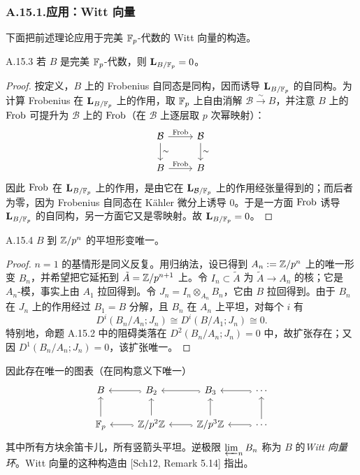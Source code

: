 \subsubsection*{A.15.1.\quad 应用：Witt 向量}

下面把前述理论应用于完美 $\mathbb{F}_p$-代数的 Witt 向量的构造。

\begin{lem}{A.15.3}\label{thm:a6-08-7}
若 $B$ 是完美 $\mathbb{F}_p$-代数，则 $\mathbf L_{B/\mathbb{F}_p}=0$。
\end{lem}

\begin{proof}
按定义，$B$ 上的 Frobenius 自同态是同构，因而诱导 $\mathbf L_{B/\mathbb{F}_p}$ 的自同构。为计算 Frobenius 在 $\mathbf L_{B/\mathbb{F}_p}$ 上的作用，取 $\mathbb{F}_p$ 上自由消解 $\mathcal B\xrightarrow{\sim}B$，并注意 $B$ 上的 $\operatorname{Frob}$ 可提升为 $\mathcal B$ 上的 $\operatorname{Frob}$（在 $\mathcal B$ 上逐层取 $p$ 次幂映射）：
\[
\begin{tikzcd}
\mathcal B \arrow[r, "\Frob"] \arrow[d, "\sim"] & \mathcal B \arrow[d, "\sim"] \\
B \arrow[r, "\Frob"] & B
\end{tikzcd}
\]
因此 $\operatorname{Frob}$ 在 $\mathbf L_{B/\mathbb{F}_p}$ 上的作用，是由它在 $\mathbf L_{\mathcal B/\mathbb{F}_p}$ 上的作用经张量得到的；而后者为零，因为 Frobenius 自同态在 Kähler 微分上诱导 0。于是一方面 $\operatorname{Frob}$ 诱导 $\mathbf L_{B/\mathbb{F}_p}$ 的自同构，另一方面它又是零映射。故 $\mathbf L_{B/\mathbb{F}_p}=0$。
\end{proof}

\begin{lem}{A.15.4}\label{thm:a6-08-8}
$B$ 到 $\mathbb{Z}/p^n$ 的平坦形变唯一。
\end{lem}

\begin{proof}
$n=1$ 的基情形是同义反复。用归纳法，设已得到 $A_n:=\mathbb{Z}/p^n$ 上的唯一形变 $B_n$，并希望把它延拓到 $\tilde A=\mathbb{Z}/p^{n+1}$ 上。令 $I_n\subset\tilde A$ 为 $\tilde A\to A_n$ 的核；它是 $A_n$-模，事实上由 $A_1$ 拉回得到。令 $J_n=I_n\otimes_{A_n}B_n$，它由 $B$ 拉回得到。由于 $B_n$ 在 $J_n$ 上的作用经过 $B_1=B$ 分解，且 $B_n$ 在 $A_n$ 上平坦，对每个 $i$ 有
\[
D^i(B_n/A_n;J_n)\cong D^i(B/A_1;J_n)\cong 0.
\]
特别地，命题 A.15.2 中的阻碍类落在 $D^2(B_n/A_n;J_n)=0$ 中，故扩张存在；又因 $D^1(B_n/A_n;J_n)=0$，该扩张唯一。
\end{proof}


因此存在唯一的图表（在同构意义下唯一）
\[
\begin{tikzcd}
B & B_2 \arrow[l, hook] & B_3 \arrow[l, hook] & \cdots \arrow[l, hook] \\
\F_p \arrow[u] & \Z/p^2\Z \arrow[u] \arrow[l, hook] & \Z/p^3\Z \arrow[u] \arrow[l, hook] & \cdots \arrow[u] \arrow[l, hook]
\end{tikzcd}
\]
其中所有方块余笛卡儿，所有竖箭头平坦。逆极限 $\varprojlim_n B_n$ 称为 $B$ 的\emph{Witt 向量环}。Witt 向量的这种构造由 [Sch12, Remark 5.14] 指出。

